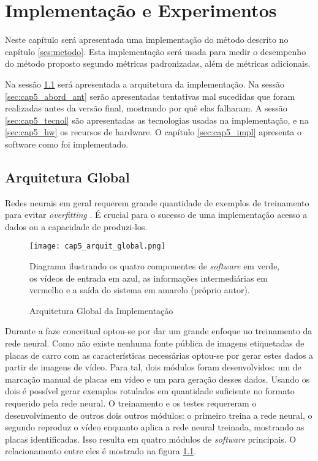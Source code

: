 
\chapter{Implementação e Experimentos}

Neste capítulo será apresentada uma implementação do método descrito
no capítulo \ref{ses:metodo}. Esta implementação será usada para medir o
desempenho do método proposto segundo métricas padronizadas, além de métricas
adicionais.

Na sessão \ref{sec:cap5:arq} será apresentada a arquitetura da implementação.
Na sessão \ref{sec:cap5_abord_ant} serão apresentadas tentativas mal sucedidas
que foram realizadas antes da versão final, mostrando por quê elas falharam. A
sessão \ref{sec:cap5_tecnol} são apresentadas as tecnologias usadas na
implementação, e na \ref{sec:cap5_hw} os recursos de hardware. O capítulo
\ref{sec:cap5_impl} apresenta o software como foi implementado.

\section{Arquitetura Global} \label{sec:cap5:arq}
Redes neurais em geral requerem grande quantidade de exemplos de treinamento
para evitar \emph{overfitting} \cite{hawkins2004problem}. É crucial para o
sucesso de uma implementação acesso a dados ou a capacidade de produzi-los.

\begin{figure}[!htb]
	\centering
	\texttt{[image: cap5\_arquit\_global.png]}
	\caption{Arquitetura Global da Implementação}
	\label{fig:cap5_arquit_global}
	Diagrama ilustrando os quatro componentes de \emph{software} em verde, os
	vídeos
	de entrada em azul, as informações intermediárias em vermelho e a saída do
	sistema em amarelo (próprio autor).
\end{figure}

Durante a faze conceitual optou-se por dar um grande enfoque no
treinamento da rede neural. Como não existe nenhuma fonte pública de imagens
etiquetadas de placas de carro com as características necessárias optou-se por
gerar estes dados a partir de imagens de vídeo.
Para tal, dois módulos foram desenvolvidos: um de
marcação manual de placas em vídeo e um para geração desses dados.
Usando os dois é possível gerar exemplos rotulados em quantidade
suficiente no formato requerido pela rede neural. O treinamento e os testes
requereram o desenvolvimento de outros dois outros módulos: o primeiro
treina a rede neural, o segundo reproduz o vídeo enquanto aplica a rede neural
treinada, mostrando as placas identificadas. Isso resulta em quatro módulos de
\emph{software} principais. O relacionamento entre eles é mostrado na figura
\ref{fig:cap5_arquit_global}.

